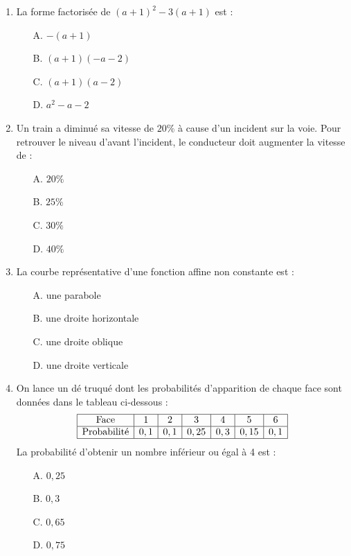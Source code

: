 \documentclass[a4paper,12pt]{article}
\begin{document}
\begin{enumerate}
\item La forme factorisée de $(a+1)^2 - 3(a+1)$ est :
\begin{itemize}
\item[A.] $-(a+1)$
\item[B.] $(a+1)(-a-2)$
\item[C.] $(a+1)(a-2)$
\item[D.] $a^2 - a - 2$
\end{itemize}

\item Un train a diminué sa vitesse de $20\%$ à cause d'un incident sur la voie. Pour retrouver le niveau d'avant l'incident, le conducteur doit augmenter la vitesse de :
\begin{itemize}
\item[A.] $20\%$
\item[B.] $25\%$
\item[C.] $30\%$
\item[D.] $40\%$
\end{itemize}

\item La courbe représentative d'une fonction affine non constante est :
\begin{itemize}
\item[A.] une parabole
\item[B.] une droite horizontale
\item[C.] une droite oblique
\item[D.] une droite verticale
\end{itemize}

\item On lance un dé truqué dont les probabilités d'apparition de chaque face sont données dans le tableau ci-dessous :
\[
\begin{array}{|c|c|c|c|c|c|c|}
\hline
\text{Face} & 1 & 2 & 3 & 4 & 5 & 6 \\
\hline
\text{Probabilité} & 0,1 & 0,1 & 0,25 & 0,3 & 0,15 & 0,1 \\
\hline
\end{array}
\]
La probabilité d'obtenir un nombre inférieur ou égal à 4 est :
\begin{itemize}
\item[A.] $0,25$
\item[B.] $0,3$
\item[C.] $0,65$
\item[D.] $0,75$
\end{itemize}

\end{enumerate}
\end{document}
